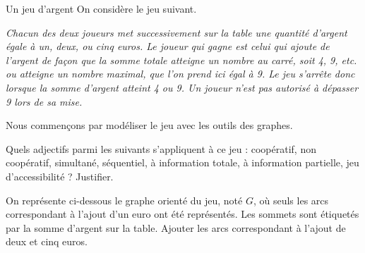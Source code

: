 \begin{exo}[PC][1][devoir]{Un jeu d'argent}
  On considère le jeu suivant.
    
  \begin{flushleft}
        \emph{
      Chacun des deux joueurs met successivement sur la table une quantité d'argent égale à un, deux, ou cinq euros. Le joueur qui gagne est celui
      qui ajoute de l’argent de façon que la somme totale atteigne un nombre au carré, soit 4, 9, etc. ou atteigne un nombre maximal, que l’on prend ici égal à 9. Le jeu s’arrête donc lorsque la somme d’argent atteint 4 ou 9. Un joueur n’est pas autorisé à dépasser 9 lors de sa mise.
      }
    \end{flushleft}
    

   Nous commençons par modéliser le jeu avec les outils des graphes.
  \begin{quest}
    \item	Quels adjectifs parmi les suivants s'appliquent à ce jeu : coopératif, non coopératif, simultané, séquentiel, à information totale, à information partielle, jeu d'accessibilité ? Justifier.
    \item On représente ci-dessous le graphe orienté du jeu, noté $G$, où seuls les arcs correspondant à l'ajout d'un euro ont été représentés.  Les sommets sont étiquetés par la somme d'argent sur la table.  Ajouter les arcs correspondant à l'ajout de deux et cinq euros. 
    

\end{quest}
\end{exo}
